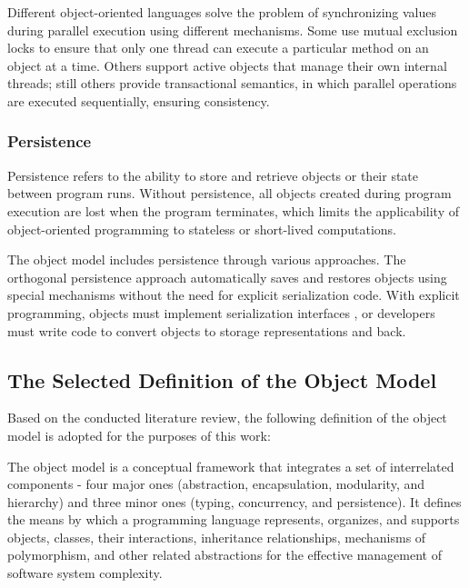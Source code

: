 Different object-oriented languages solve the problem of synchronizing values during parallel execution using different mechanisms. Some use mutual exclusion locks to ensure that only one thread can execute a particular method on an object at a time. Others support active objects that manage their own internal threads; still others provide transactional semantics, in which parallel operations are executed sequentially, ensuring consistency.

\subsubsection{Persistence}

Persistence refers to the ability to store and retrieve objects or their state between program runs. Without persistence, all objects created during program execution are lost when the program terminates, which limits the applicability of object-oriented programming to stateless or short-lived computations.

The object model includes persistence through various approaches. The orthogonal persistence approach automatically saves and restores objects using special mechanisms without the need for explicit serialization code. With explicit programming, objects must implement serialization interfaces \cite{atkinson1995orthogonally}, or developers must write code to convert objects to storage representations and back.

\subsection{The Selected Definition of the Object Model}

Based on the conducted literature review, the following definition of the object model is adopted for the purposes of this work:

The object model is a conceptual framework that integrates a set of interrelated components - four major ones (abstraction, encapsulation, modularity, and hierarchy) and three minor ones (typing, concurrency, and persistence). It defines the means by which a programming language represents, organizes, and supports objects, classes, their interactions, inheritance relationships, mechanisms of polymorphism, and other related abstractions for the effective management of software system complexity.
